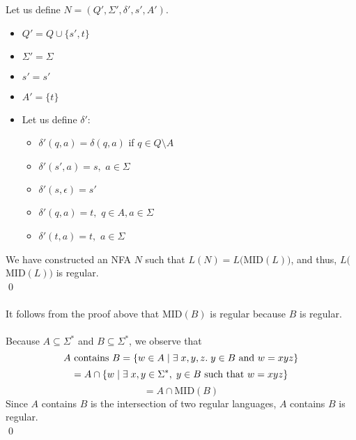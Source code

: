 \documentclass[11pt]{article}
\begin{document}
Let us define $N=(Q',\Sigma',\delta',s',A')$.
\begin{itemize}
	\item $Q'=Q\cup\{s',t\}$
	\item $\Sigma'=\Sigma$
	\item $s'=s'$
	\item $A'=\{t\}$
	\item Let us define $\delta'$:
	\begin{itemize}
		\item $\delta'(q,a)=\delta(q,a)$ if $q\in Q\setminus A$
		\item $\delta'(s',a)=s,$ $a\in\Sigma$
		\item $\delta'(s,\epsilon)=s'$
		\item $\delta'(q,a)=t,$ $q\in A,a\in\Sigma$
		\item $\delta'(t,a)=t,$ $a\in\Sigma$
	\end{itemize}
\end{itemize}
We have constructed an NFA $N$ such that $L(N)=L($MID$(L))$, and thus, $L($MID$(L))$ is regular. \\ \qed \\ \\
It follows from the proof above that MID$(B)$ is regular because $B$ is regular. \\ \\
Because $A\subseteq\Sigma^*$ and $B\subseteq\Sigma^*$, we observe that
\[A\text{ contains }B=\{w\in A\hspace{1mm}|\hspace{1mm}\exists\hspace{1mm}x,y,z.\hspace{1mm}y\in B\text{ and }w=xyz\}\]
\[=A\cap\{w\hspace{1mm}|\hspace{1mm}\exists\hspace{1mm}x,y\in\Sigma^*,\hspace{1mm}y\in B\text{ such that }w=xyz\}\]
\[=A\cap\text{MID}(B)\]
Since $A$ contains $B$ is the intersection of two regular languages, $A$ contains $B$ is regular. \\ \qed
\end{document}
